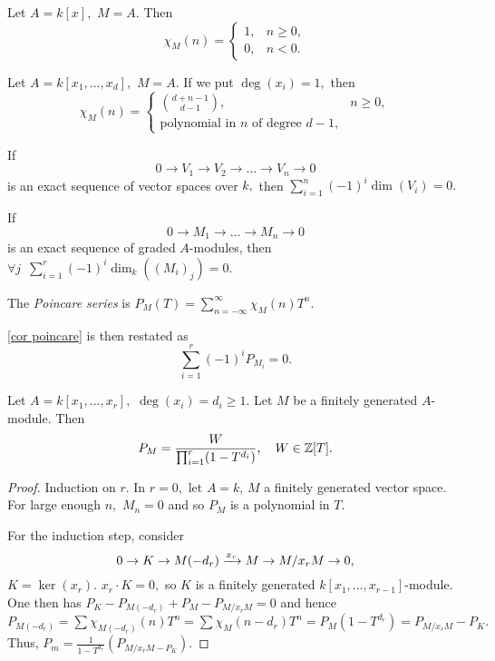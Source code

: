 \begin{example}
  Let \(A = k[x],\) \(M = A.\) Then
  \[\chi_M(n) =
    \begin{cases}
      1, & n \geq 0, \\
      0, & n < 0.
    \end{cases}\]
\end{example}

\begin{example}
  Let \(A = k[x_1, \dotsc, x_d],\) \(M = A.\) If we put \(\deg(x_i) = 1,\) then
  \[\chi_M(n) =
    \begin{cases}
      \binom{d+n-1}{d-1}, & n \geq 0, \\
      \text{polynomial in $n$ of degree $d-1$}, & 
    \end{cases}
  \]
\end{example}

\begin{note}
  If
  \[0 \to V_1 \to V_2 \to \dotso \to V_n \to 0\]
  is an exact sequence of vector spaces over \(k,\) then
  \(\sum_{i=1}^n (-1)^i \dim(V_i) = 0.\)
\end{note}

\begin{corollary}
  \label{cor poincare}
  If
  \[0 \to M_1 \to \dotso \to M_n \to 0\]
  is an exact sequence of graded \(A\)-modules, then
  \(\forall j \enspace \sum_{i=1}^r (-1)^i \dim_k((M_i)_j) = 0.\)
\end{corollary}

\begin{df}
  The \emph{Poincare series} is
  \(P_M(T) = \sum_{n=-\infty}^\infty \chi_M(n) T^n.\)
\end{df}

\begin{note}
  \cref{cor poincare} is then restated as
  \[\sum_{i=1}^r (-1)^i P_{M_i} = 0.\]
\end{note}

\begin{theorem}
  Let \(A = k[x_1, \dotsc, x_r],\) \(\deg(x_i) = d_i \geq 1.\)
  Let \(M\) be a finitely generated \(A\)-module.
  Then
  \[P_M = \frac{W}{\prod_{i=1}^r (1 - T^{d_i})}, \quad W \in \mathbb Z[T].\]
\end{theorem}
\begin{proof}
  Induction on \(r\). In \(r = 0,\) let \(A = k\), \(M\) a finitely generated vector space. For large enough \(n,\) \(M_n = 0\) and so \(P_M\) is a polynomial in \(T.\)

  For the induction step, consider
  \[0 \to K \to M(-d_r) \xrightarrow{x_r} M \to M / {x_r M} \to 0,\]
  \(K = \ker(x_r).\)
  \(x_r \cdot K = 0,\) so \(K\) is a finitely generated \(k[x_1, \dotsc, x_{r-1}]\)-module.
  One then has
  \(P_K - P_{M(-d_r)} + P_M - P_{M /{x_r M}} = 0\)
  and hence
  \(P_{M(-d_r)} = \sum \chi_{M(-d_r)}(n)T^n = \sum \chi_M(n-d_r) T^n = P_M(1-T^{d_r}) = P_{M/{x_r M}} - P_K.\)
  Thus,
  \(P_m = \frac{1}{1-T^{d_r}}(P_{M/{x_r M} - P_K}).\)
\end{proof}

